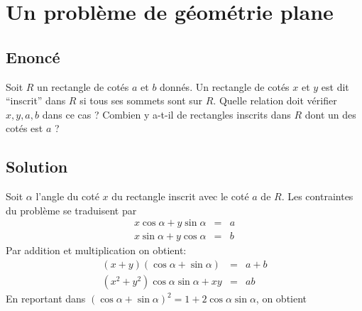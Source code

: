 \documentclass{article}
\begin{document}
\section{Un problème de géométrie plane}

\subsection{Enoncé}
Soit $R$ un rectangle de cotés $a$ et $b$ donnés. Un rectangle de cotés $x$ et $y$ est dit ``inscrit'' dans $R$ si tous ses sommets sont sur $R$. Quelle relation doit vérifier $x,y,a,b$ dans ce cas ? Combien y a-t-il de rectangles inscrits dans $R$ dont un des cotés est $a$ ?
\subsection{Solution}
\begin{center}
\end{center}
Soit $\alpha$ l'angle du coté $x$ du rectangle inscrit avec le coté $a$ de $R$. Les contraintes du problème se traduisent par
\begin{eqnarray*}
x\cos\alpha+y\sin\alpha & = & a\\
x\sin\alpha+y\cos\alpha & = & b
\end{eqnarray*}
Par addition et multiplication on obtient:
\begin{eqnarray*}
(x+y)(\cos\alpha+\sin\alpha) & = & a+b\\
(x^2+y^2)\cos\alpha\sin\alpha+xy & = & ab
\end{eqnarray*}
En reportant dans $(\cos\alpha+\sin\alpha)^2=1+2\cos\alpha\sin\alpha$, on obtient
\end{document}
